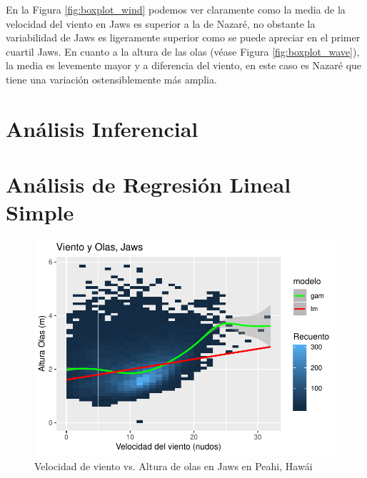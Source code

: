 En la Figura \ref{fig:boxplot_wind} podemos ver claramente como la media de la velocidad del viento en Jaws es superior a la de Nazaré, no obstante la variabilidad de Jaws es ligeramente superior como se puede apreciar en el primer cuartil Jaws. En cuanto a la altura de las olas (véase Figura \ref{fig:boxplot_wave}), la media es levemente mayor y a diferencia del viento, en este caso es Nazaré que tiene una variación ostensiblemente más amplia.

\section{Análisis Inferencial}%
\label{sec:resultados}

\section{Análisis de Regresión Lineal Simple}
\label{sec:rls}


\begin{figure}[H]
\label{fig:wind_waves_jaws_all}
\centering
\includegraphics{./figures/jaws_all.pdf}
  \caption{Velocidad de viento vs. Altura de olas en Jaws en Peahi, Hawái}
\end{figure}

